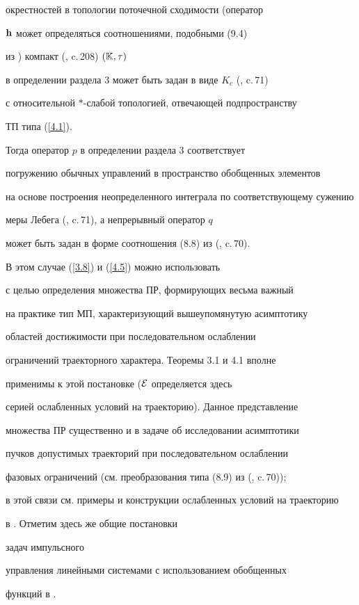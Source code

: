 {окрестностей в топологии поточечной сходимости (оператор


${\bold h}$ может определяться соотношениями, подобными (9.4)


из \cite{15}) компакт (\cite{4}, c.\,208) $({\Bbb K},\tau)$


в определении раздела 3 может быть задан в виде $K_c$ (\cite{15}, c.\,71)


с относительной $*$-слабой топологией, отвечающей подпространству


ТП типа (\ref{4.1}).


Тогда оператор $p$ в определении раздела 3 соответствует 


погружению обычных управлений в пространство обобщенных элементов


на основе построения неопределенного интеграла по соответствующему сужению


меры Лебега (\cite{15}, c.\,71), а непрерывный оператор $q$


может быть задан в форме соотношения (8.8) из (\cite{15}, c.\,70).


В этом случае (\ref{3.8}) и (\ref{4.5}) можно использовать


с целью определения множества ПР, формирующих весьма важный


на практике тип МП, характеризующий вышеупомянутую асимптотику


областей достижимости при последовательном ослаблении


ограничений траекторного характера. Теоремы 3.1 и 4.1 вполне


применимы к этой постановке (${\cal E}$ определяется здесь


серией ослабленных условий на траекторию). Данное представление


множества ПР существенно и в задаче об исследовании асимптотики


пучков допустимых траекторий при последовательном ослаблении


фазовых ограничений (см. преобразования типа (8.9) из (\cite{15}, c.\,70));


в этой связи см. примеры и конструкции ослабленных условий на траекторию


в \cite{16}. Отметим здесь же общие постановки


задач импульсного


управления линейными системами с использованием обобщенных


функций в \cite{17}.








}
